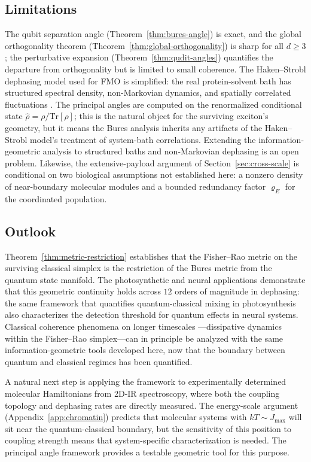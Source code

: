 \documentclass[12pt,a4paper]{article}
\theoremstyle{definition}
\theoremstyle{remark}
\begin{document}
\subsection{Limitations}

The qubit separation angle (Theorem~\ref{thm:bures-angle}) is exact, and the global orthogonality theorem (Theorem~\ref{thm:global-orthogonality}) is sharp for all $d \geq 3$; the perturbative expansion (Theorem~\ref{thm:qudit-angles}) quantifies the departure from orthogonality but is limited to small coherence. The Haken--Strobl dephasing model used for FMO is simplified: the real protein-solvent bath has structured spectral density, non-Markovian dynamics, and spatially correlated fluctuations \cite{cao2020quantum}. The principal angles are computed on the renormalized conditional state $\hat{\rho} = \rho/\mathrm{Tr}[\rho]$; this is the natural object for the surviving exciton's geometry, but it means the Bures analysis inherits any artifacts of the Haken--Strobl model's treatment of system-bath correlations. Extending the information-geometric analysis to structured baths and non-Markovian dephasing is an open problem. Likewise, the extensive-payload argument of Section~\ref{sec:cross-scale} is conditional on two biological assumptions not established here: a nonzero density of near-boundary molecular modules and a bounded redundancy factor $\varrho_E$ for the coordinated population.

\subsection{Outlook}
\label{sec:bridge}

Theorem~\ref{thm:metric-restriction} establishes that the Fisher--Rao metric on the surviving classical simplex is the restriction of the Bures metric from the quantum state manifold. The photosynthetic and neural applications demonstrate that this geometric continuity holds across $12$ orders of magnitude in dephasing: the same framework that quantifies quantum-classical mixing in photosynthesis also characterizes the detection threshold for quantum effects in neural systems. Classical coherence phenomena on longer timescales \cite{todd2026coherence,todd2026intelligence}---dissipative dynamics within the Fisher--Rao simplex---can in principle be analyzed with the same information-geometric tools developed here, now that the boundary between quantum and classical regimes has been quantified.

A natural next step is applying the framework to experimentally determined molecular Hamiltonians from 2D-IR spectroscopy, where both the coupling topology and dephasing rates are directly measured. The energy-scale argument (Appendix~\ref{app:chromatin}) predicts that molecular systems with $kT \sim J_{\max}$ will sit near the quantum-classical boundary, but the sensitivity of this position to coupling strength means that system-specific characterization is needed. The principal angle framework provides a testable geometric tool for this purpose.
\end{document}
